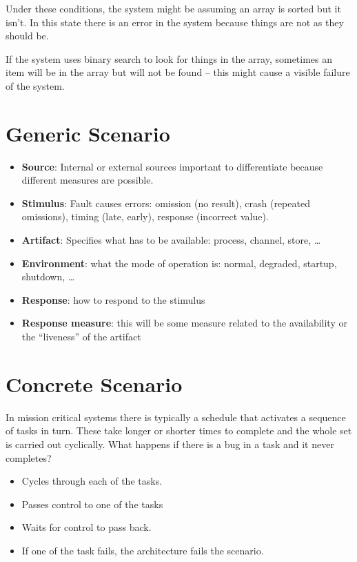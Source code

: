 \documentclass{report}
\begin{document}
Under these conditions, the system might be assuming an array is sorted but it isn’t.  In this state there is an error in the system because things are not as they should be.\newline

If the system uses binary search to look for things in the array, sometimes an item will be in the array but will not be found – this might cause a visible failure  of the system.

\section{Generic Scenario}

\begin{itemize}
\item{\textbf{Source}: Internal or external sources important to differentiate because different measures are possible.}
\item{\textbf{Stimulus}: Fault causes errors: omission (no result), crash (repeated omissions), timing (late, early), response (incorrect value).}
\item{\textbf{Artifact}: Specifies what has to be available: process, channel, store, …}
\item{\textbf{Environment}: what the mode of operation is: normal, degraded, startup, shutdown, …}
\item{\textbf{Response}:  how to respond to the stimulus }
\item{\textbf{Response measure}: this will be some measure related to the availability or the “liveness” of the artifact}
\end{itemize}

\section{Concrete Scenario}

In mission critical systems there is typically a schedule that activates a sequence of tasks in turn.  These take longer or shorter times to complete and the whole set is carried out cyclically. What happens if there is a bug in a task and it never completes?

\begin{itemize}
\item{Cycles through each of the tasks.}
\item{Passes control to one of the tasks}
\item{Waits for control to pass back.}
\item{If one of the task fails, the architecture fails the scenario.}
\end{itemize}
\end{document}

